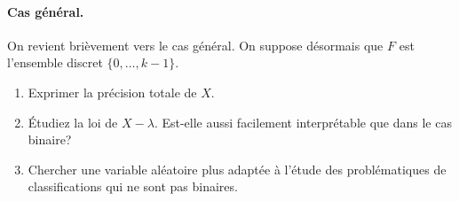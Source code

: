 \documentclass[11pt, a4paper]{article}
\begin{document}
\paragraph{Cas général.} On revient brièvement vers le cas général. On
suppose désormais que $F$ est l'ensemble discret $\{0, \ldots, k-1\}$.
\begin{question}
  \begin{enumerate}
  \item Exprimer la précision totale de $X$.
  \item Étudiez la loi de $X-\lambda$. Est-elle aussi facilement
    interprétable que dans le cas binaire?
  \item Chercher une variable aléatoire plus adaptée à l'étude des
    problématiques de classifications qui ne sont pas binaires.
  \end{enumerate}
\end{question}







\end{document}
